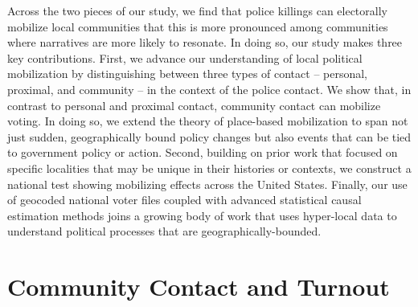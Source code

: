 \documentclass[12pt]{article}
\newcommand{\kscomment}[1]{\textbf{\textcolor{Thistle}{[[ #1 --- KS ]]}}}
\begin{document}

Across the two pieces of our study, we find that police killings can electorally mobilize local communities that this is more pronounced among communities where narratives are more likely to resonate. %
In doing so, our study makes three key contributions. First, we advance our understanding of local political mobilization by distinguishing between three types of contact -- personal, proximal, and community -- in the context of the police contact. We show that, in contrast to personal and proximal contact, community contact can mobilize voting. In doing so, we extend the theory of place-based mobilization to span not just sudden, geographically bound policy changes but also events that can be tied to government policy or action. 
Second, building on prior work that focused on specific localities that may be unique in their histories or contexts, we construct a national test showing mobilizing effects across the United States. Finally, our use of geocoded national voter files coupled with advanced statistical causal estimation methods joins a growing body of work \cite[e.g.][]{TamCho2013, Hersh2016, Brown2021} that uses hyper-local data to understand political processes that are geographically-bounded. %

\section*{Community Contact and Turnout}%
\end{document}
